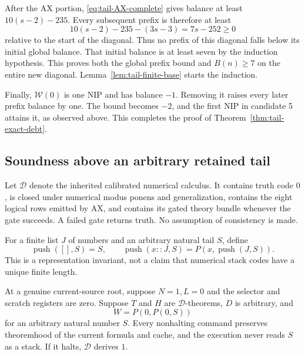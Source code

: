 After the AX portion, \eqref{eq:tail-AX-complete} gives balance at least
$10(s-2)-235$. Every subsequent prefix is therefore at least
\[
 10(s-2)-235-(3s-3)=7s-252\geq0
\]
relative to the start of the diagonal. Thus no prefix of this diagonal
falls below its initial global balance. That initial balance is at
least seven by the induction hypothesis. This proves both the global
prefix bound and $B(n)\geq7$ on the entire new diagonal.
Lemma~\ref{lem:tail-finite-base} starts the induction.

Finally, $\mathcal W(0)$ is one NIP and has balance $-1$.
Removing it raises every later prefix balance by one. The bound becomes
$-2$, and the first NIP in candidate 5 attains it, as observed above.
This completes the proof of Theorem~\ref{thm:tail-exact-debt}.

\subsection{Soundness above an arbitrary retained tail}

Let $\mathcal D$ denote the inherited calibrated numerical calculus.
It contains truth code $0$, is closed under numerical modus ponens and
generalization, contains the eight logical rows emitted by AX, and
contains its gated theory bundle whenever the gate succeeds.
A failed gate returns truth. No assumption of consistency is made.

For a finite list $J$ of numbers and an arbitrary natural tail $S$,
define
\[
 \operatorname{push}([],S)=S,\qquad
 \operatorname{push}(x::J,S)=P(x,\operatorname{push}(J,S)).
\]
This is a representation invariant, not a claim that numerical stack
codes have a unique finite length.

\begin{theorem}
\label{thm:tail-source-sound}
At a genuine current-source root, suppose $N=1,L=0$ and the selector and
scratch registers are zero. Suppose $T$ and $H$ are $\mathcal D$-theorems,
$D$ is arbitrary, and
\[
 W=P(0,P(0,S))
\]
for an arbitrary natural number $S$.
Every nonhalting command preserves theoremhood of the current formula
and cache, and the execution never reads $S$ as a stack.
If it halts, $\mathcal D$ derives $1$.
\end{theorem}


